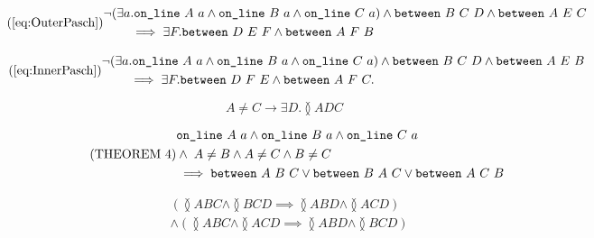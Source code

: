 \begin{equation}
  \tag{\ref{eq:OuterPasch}}
  \begin{split}
    &\Triangle{a}{A}{B}{C} \wedge \between{B}{C}{D} \wedge \between{A}{E}{C}\\ 
    &\qquad\implies \exists F. \between{D}{E}{F} \wedge \between{A}{F}{B}
  \end{split}
\end{equation}

\begin{equation}
  \tag{\ref{eq:InnerPasch}}
  \begin{split}
    &\Triangle{a}{A}{B}{C} \wedge \between{B}{C}{D} \wedge \between{A}{E}{B}\\ 
    &\qquad\implies \exists F. \between{D}{F}{E} \wedge \between{A}{F}{C}.
  \end{split}
\end{equation}

\begin{equation}\label{eq:three}\tag{THEOREM~3}
A \neq C \rightarrow \exists D. \between{A}{D}{C}
\end{equation}

\begin{equation}\label{eq:four}\tag{THEOREM~4}
  \begin{split}
    &\texttt{on\_line}\ A\ a \wedge \texttt{on\_line}\ B\ a \wedge \texttt{on\_line}\ C\ a \\
    &\wedge\; A \neq B \wedge A \neq C \wedge B \neq C\\
    &\implies \texttt{between}\ A\ B\ C \vee \texttt{between}\ B\ A\ C \vee \texttt{between}\ A\ C\ B
  \end{split}
\end{equation}

\begin{equation}\label{eq:five}\tag{THEOREM~5}
  \begin{split}
    &(\between{A}{B}{C} \wedge \between{B}{C}{D} \implies \between{A}{B}{D} \wedge \between{A}{C}{D})\\
    &\wedge(\between{A}{B}{C} \wedge \between{A}{C}{D} \implies \between{A}{B}{D} \wedge \between{B}{C}{D})
  \end{split}
\end{equation}

